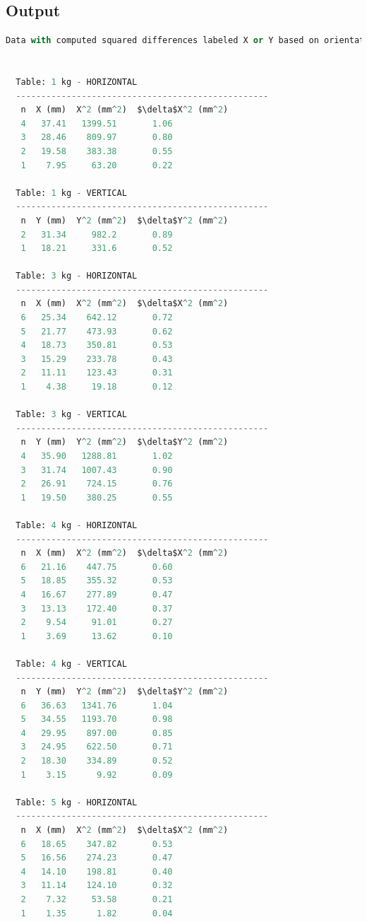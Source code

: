 \documentclass[a4paper,11pt]{article}
\begin{document}
\subsection{Output}
\begin{lstlisting}[language=Python]
  Data with computed squared differences labeled X or Y based on orientation:


  Table: 1 kg - HORIZONTAL
  --------------------------------------------------
   n  X (mm)  X^2 (mm^2)  $\delta$X^2 (mm^2)
   4   37.41   1399.51       1.06
   3   28.46    809.97       0.80
   2   19.58    383.38       0.55
   1    7.95     63.20       0.22
  
  Table: 1 kg - VERTICAL
  --------------------------------------------------
   n  Y (mm)  Y^2 (mm^2)  $\delta$Y^2 (mm^2)
   2   31.34     982.2       0.89
   1   18.21     331.6       0.52
  
  Table: 3 kg - HORIZONTAL
  --------------------------------------------------
   n  X (mm)  X^2 (mm^2)  $\delta$X^2 (mm^2)
   6   25.34    642.12       0.72
   5   21.77    473.93       0.62
   4   18.73    350.81       0.53
   3   15.29    233.78       0.43
   2   11.11    123.43       0.31
   1    4.38     19.18       0.12
  
  Table: 3 kg - VERTICAL
  --------------------------------------------------
   n  Y (mm)  Y^2 (mm^2)  $\delta$Y^2 (mm^2)
   4   35.90   1288.81       1.02
   3   31.74   1007.43       0.90
   2   26.91    724.15       0.76
   1   19.50    380.25       0.55
  
  Table: 4 kg - HORIZONTAL
  --------------------------------------------------
   n  X (mm)  X^2 (mm^2)  $\delta$X^2 (mm^2)
   6   21.16    447.75       0.60
   5   18.85    355.32       0.53
   4   16.67    277.89       0.47
   3   13.13    172.40       0.37
   2    9.54     91.01       0.27
   1    3.69     13.62       0.10
  
  Table: 4 kg - VERTICAL
  --------------------------------------------------
   n  Y (mm)  Y^2 (mm^2)  $\delta$Y^2 (mm^2)
   6   36.63   1341.76       1.04
   5   34.55   1193.70       0.98
   4   29.95    897.00       0.85
   3   24.95    622.50       0.71
   2   18.30    334.89       0.52
   1    3.15      9.92       0.09
  
  Table: 5 kg - HORIZONTAL
  --------------------------------------------------
   n  X (mm)  X^2 (mm^2)  $\delta$X^2 (mm^2)
   6   18.65    347.82       0.53
   5   16.56    274.23       0.47
   4   14.10    198.81       0.40
   3   11.14    124.10       0.32
   2    7.32     53.58       0.21
   1    1.35      1.82       0.04
  

\end{lstlisting}
\end{document}
